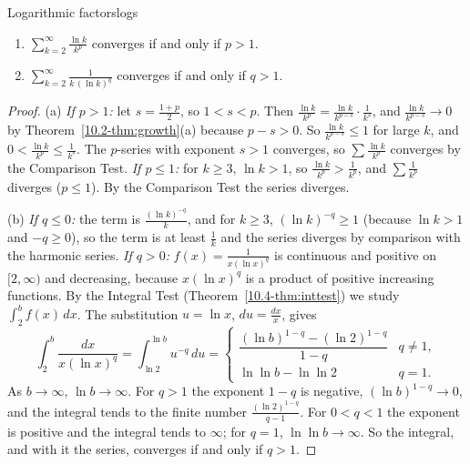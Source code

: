 \documentclass[11pt]{article}
\begin{document}
\begin{thm}{Logarithmic factors}{logs}
\begin{enumerate}[label=(\alph*)]
  \item $\displaystyle\sum_{k=2}^\infty\frac{\ln k}{k^p}$ converges if and only if $p>1$.
  \item $\displaystyle\sum_{k=2}^\infty\frac1{k\,(\ln k)^q}$ converges if and only if $q>1$.
\end{enumerate}
\end{thm}
\begin{proof}
(a) \emph{If $p>1$:} let $s=\frac{1+p}2$, so $1<s<p$. Then $\frac{\ln k}{k^p}=\frac{\ln k}{k^{p-s}}\cdot\frac1{k^s}$, and $\frac{\ln k}{k^{p-s}}\to0$ by Theorem~\ref{10.2-thm:growth}(a) because $p-s>0$. So $\frac{\ln k}{k^{p-s}}\le1$ for large $k$, and $0<\frac{\ln k}{k^p}\le\frac1{k^s}$. The $p$-series with exponent $s>1$ converges, so $\sum\frac{\ln k}{k^p}$ converges by the Comparison Test. \emph{If $p\le1$:} for $k\ge3$, $\ln k>1$, so $\frac{\ln k}{k^p}>\frac1{k^p}$, and $\sum\frac1{k^p}$ diverges ($p\le1$). By the Comparison Test the series diverges.

(b) \emph{If $q\le0$:} the term is $\frac{(\ln k)^{-q}}k$, and for $k\ge3$, $(\ln k)^{-q}\ge1$ (because $\ln k>1$ and $-q\ge0$), so the term is at least $\frac1k$ and the series diverges by comparison with the harmonic series. \emph{If $q>0$:} $f(x)=\frac1{x(\ln x)^q}$ is continuous and positive on $[2,\infty)$ and decreasing, because $x(\ln x)^q$ is a product of positive increasing functions. By the Integral Test (Theorem~\ref{10.4-thm:inttest}) we study $\int_2^b f(x)\,dx$. The substitution $u=\ln x$, $du=\frac{dx}x$, gives
\[
\int_2^b\frac{dx}{x(\ln x)^q}=\int_{\ln2}^{\ln b}u^{-q}\,du=\begin{cases}\dfrac{(\ln b)^{1-q}-(\ln2)^{1-q}}{1-q}&q\ne1,\\[6pt]\ln\ln b-\ln\ln2&q=1.\end{cases}
\]
As $b\to\infty$, $\ln b\to\infty$. For $q>1$ the exponent $1-q$ is negative, $(\ln b)^{1-q}\to0$, and the integral tends to the finite number $\frac{(\ln2)^{1-q}}{q-1}$. For $0<q<1$ the exponent is positive and the integral tends to $\infty$; for $q=1$, $\ln\ln b\to\infty$. So the integral, and with it the series, converges if and only if $q>1$.
\end{proof}
\end{document}
